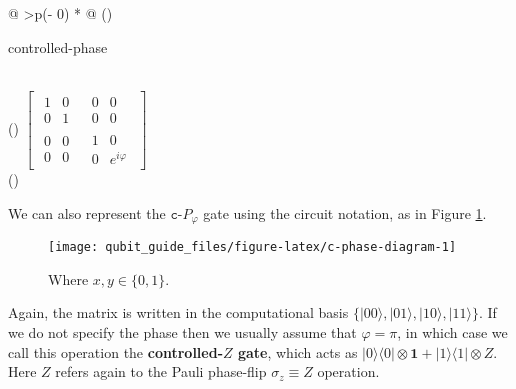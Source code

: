 \documentclass[fleqn]{article}
\newenvironment{idea}{\noindent}{\medskip}
\begin{document}
\begin{idea}

\begin{longtable}[]{@{}
  >{\centering\arraybackslash}p{(\columnwidth - 0\tabcolsep) * }@{}}
\toprule()
\begin{minipage}[b]{\linewidth}\centering
controlled-phase
\end{minipage} \\
\midrule()
\endhead
\(\left[\begin{array}{c|c}\begin{matrix}1&0\\0&1\end{matrix}&\begin{matrix}0&0\\0&0\end{matrix}\\\hline\begin{matrix}0&0\\0&0\end{matrix}&\begin{matrix}1&0\\0&e^{i\varphi}\end{matrix}\end{array}\right]\) \\
\bottomrule()
\end{longtable}

\end{idea}

We can also represent the \(\texttt{c-}P_\varphi\) gate using the circuit notation, as in Figure \ref{fig:c-phase-diagram}.



\begin{figure}[H]

{\centering \texttt{[image: qubit\_guide\_files/figure-latex/c-phase-diagram-1]} 

}

\caption{Where \(x,y\in\{0,1\}\).}\label{fig:c-phase-diagram}
\end{figure}

Again, the matrix is written in the computational basis \(\{|00\rangle,|01\rangle,|10\rangle,|11\rangle\}\).
If we do not specify the phase then we usually assume that \(\varphi=\pi\), in which case we call this operation the \textbf{controlled-\(Z\) gate}, which acts as \(|0\rangle\langle 0|\otimes\mathbf{1}+ |1\rangle\langle 1|\otimes Z\).
Here \(Z\) refers again to the Pauli phase-flip \(\sigma_z\equiv Z\) operation.
\end{document}
